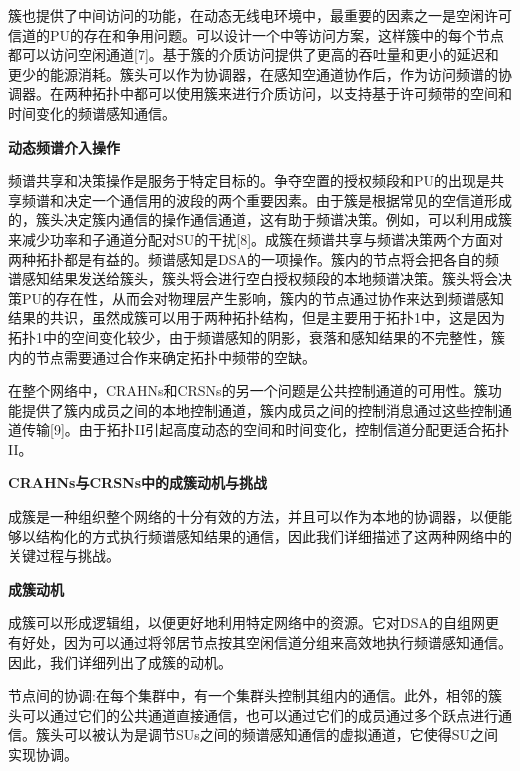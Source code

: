\documentclass[a4paper,AutoFakeBold,oneside,12pt]{book}
\begin{document}
  簇也提供了中间访问的功能，在动态无线电环境中，最重要的因素之一是空闲许可信道的PU的存在和争用问题。可以设计一个中等访问方案，这样簇中的每个节点都可以访问空闲通道[7]。基于簇的介质访问提供了更高的吞吐量和更小的延迟和更少的能源消耗。簇头可以作为协调器，在感知空通道协作后，作为访问频谱的协调器。在两种拓扑中都可以使用簇来进行介质访问，以支持基于许可频带的空间和时间变化的频谱感知通信。

\begin{center}
\textbf{动态频谱介入操作}
\end{center}

  频谱共享和决策操作是服务于特定目标的。争夺空置的授权频段和PU的出现是共享频谱和决定一个通信用的波段的两个重要因素。由于簇是根据常见的空信道形成的，簇头决定簇内通信的操作通信通道，这有助于频谱决策。例如，可以利用成簇来减少功率和子通道分配对SU的干扰[8]。成簇在频谱共享与频谱决策两个方面对两种拓扑都是有益的。频谱感知是DSA的一项操作。簇内的节点将会把各自的频谱感知结果发送给簇头，簇头将会进行空白授权频段的本地频谱决策。簇头将会决策PU的存在性，从而会对物理层产生影响，簇内的节点通过协作来达到频谱感知结果的共识，虽然成簇可以用于两种拓扑结构，但是主要用于拓扑1中，这是因为拓扑1中的空间变化较少，由于频谱感知的阴影，衰落和感知结果的不完整性，簇内的节点需要通过合作来确定拓扑中频带的空缺。

  在整个网络中，CRAHNs和CRSNs的另一个问题是公共控制通道的可用性。簇功能提供了簇内成员之间的本地控制通道，簇内成员之间的控制消息通过这些控制通道传输[9]。由于拓扑II引起高度动态的空间和时间变化，控制信道分配更适合拓扑II。


\begin{center}
\textbf{CRAHNs与CRSNs中的成簇动机与挑战}
\end{center}

  成簇是一种组织整个网络的十分有效的方法，并且可以作为本地的协调器，以便能够以结构化的方式执行频谱感知结果的通信，因此我们详细描述了这两种网络中的关键过程与挑战。


\begin{center}
\textbf{成簇动机}
\end{center}

  成簇可以形成逻辑组，以便更好地利用特定网络中的资源。它对DSA的自组网更有好处，因为可以通过将邻居节点按其空闲信道分组来高效地执行频谱感知通信。因此，我们详细列出了成簇的动机。

  节点间的协调:在每个集群中，有一个集群头控制其组内的通信。此外，相邻的簇头可以通过它们的公共通道直接通信，也可以通过它们的成员通过多个跃点进行通信。簇头可以被认为是调节SUs之间的频谱感知通信的虚拟通道，它使得SU之间实现协调。
\end{document}
